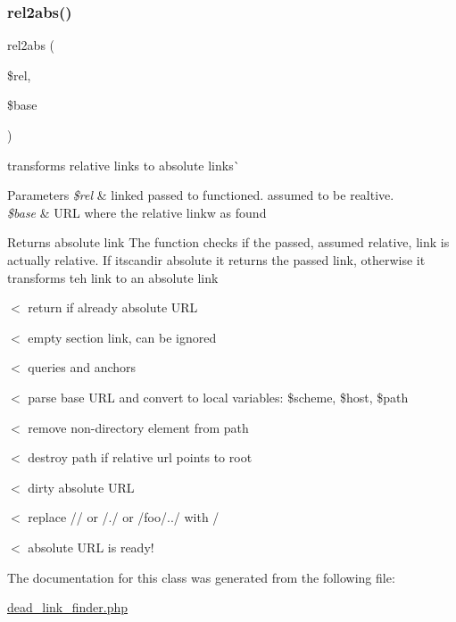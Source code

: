 \subsubsection{\texorpdfstring{rel2abs()}{rel2abs()}}
{\footnotesize\ttfamily rel2abs (\begin{DoxyParamCaption}\item[{}]{\$rel,  }\item[{}]{\$base }\end{DoxyParamCaption})}



transforms relative links to absolute links\`{} 


\begin{DoxyParams}{Parameters}
{\em \$rel} & linked passed to functioned. assumed to be realtive. \\
\hline
{\em \$base} & U\+RL where the relative linkw as found \\
\hline
\end{DoxyParams}
\begin{DoxyReturn}{Returns}
absolute link The function checks if the passed, assumed relative, link is actually relative. If it\textquotesingle{}scandir absolute it returns the passed link, otherwise it transforms teh link to an absolute link 
\end{DoxyReturn}
$<$ return if already absolute U\+RL

$<$ empty section link, can be ignored

$<$ queries and anchors

$<$ parse base U\+RL and convert to local variables\+: \$scheme, \$host, \$path

$<$ remove non-\/directory element from path

$<$ destroy path if relative url points to root

$<$ dirty absolute U\+RL

$<$ replace \textquotesingle{}//\textquotesingle{} or \textquotesingle{}/./\textquotesingle{} or \textquotesingle{}/foo/../\textquotesingle{} with \textquotesingle{}/\textquotesingle{}

$<$ absolute U\+RL is ready! 

The documentation for this class was generated from the following file\+:\begin{DoxyCompactItemize}
\item 
\mbox{\hyperlink{dead__link__finder_8php}{dead\+\_\+link\+\_\+finder.\+php}}\end{DoxyCompactItemize}

